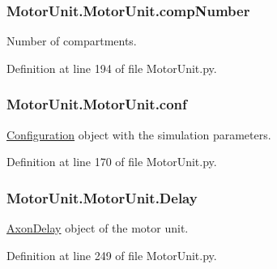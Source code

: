 \subsubsection[{\texorpdfstring{comp\+Number}{compNumber}}]{\setlength{\rightskip}{0pt plus 5cm}Motor\+Unit.\+Motor\+Unit.\+comp\+Number}\hypertarget{class_motor_unit_1_1_motor_unit_afe7281fb12c41102980b6b48d5a49713}{}\label{class_motor_unit_1_1_motor_unit_afe7281fb12c41102980b6b48d5a49713}


Number of compartments. 



Definition at line 194 of file Motor\+Unit.\+py.

\subsubsection[{\texorpdfstring{conf}{conf}}]{\setlength{\rightskip}{0pt plus 5cm}Motor\+Unit.\+Motor\+Unit.\+conf}\hypertarget{class_motor_unit_1_1_motor_unit_a10539f5129881188923f3a3a164d2cba}{}\label{class_motor_unit_1_1_motor_unit_a10539f5129881188923f3a3a164d2cba}


\hyperlink{namespace_configuration}{Configuration} object with the simulation parameters. 



Definition at line 170 of file Motor\+Unit.\+py.

\subsubsection[{\texorpdfstring{Delay}{Delay}}]{\setlength{\rightskip}{0pt plus 5cm}Motor\+Unit.\+Motor\+Unit.\+Delay}\hypertarget{class_motor_unit_1_1_motor_unit_abe82ffa1e293d10225b67870a962eab8}{}\label{class_motor_unit_1_1_motor_unit_abe82ffa1e293d10225b67870a962eab8}


\hyperlink{namespace_axon_delay}{Axon\+Delay} object of the motor unit. 



Definition at line 249 of file Motor\+Unit.\+py.

